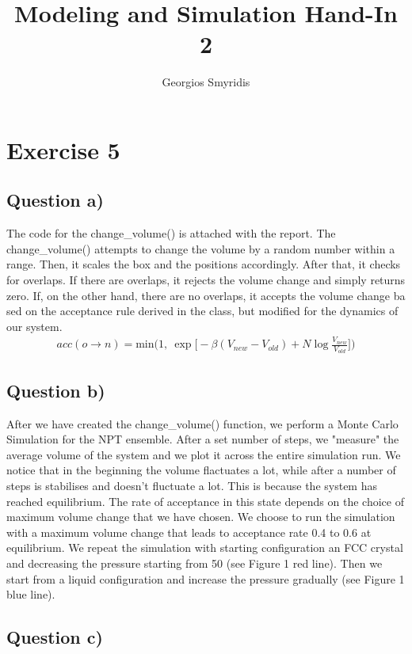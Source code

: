 \documentclass[11pt]{report}
\title{Modeling and Simulation Hand-In 2}
\author{Georgios Smyridis}
\date{}
\begin{document}
\maketitle

\section*{Exercise 5}

\subsection*{Question a)}
The code for the change\_volume() is attached with the report. The change\_volume() attempts to change the volume by a random number within a range. Then, it scales the box and the positions accordingly. After that, it checks for overlaps. If there are overlaps, it rejects the volume change and simply returns zero. If, on the other hand, there are no overlaps, it accepts the volume change ba	sed on the acceptance rule derived in the class, but modified for the dynamics of our system.
\begin{align}
	acc(o\rightarrow n) = \text{min}\bigg(1,\ \exp\bigg[-\beta(V_{new}-V_{old})+N\log\frac{V_{new}}{V_{old}}\bigg]\bigg)
\end{align}

\subsection*{Question b)}

After we have created the change\_volume() function, we perform a Monte Carlo Simulation for the NPT ensemble. After a set number of steps, we "measure" the average volume of the system and we plot it across the entire simulation run. We notice that in the beginning the volume flactuates a lot, while after a number of steps is stabilises and doesn't fluctuate a lot. This is because the system has reached equilibrium. The rate of acceptance in this state depends on the choice of maximum volume change that we have chosen. We choose to run the simulation with a maximum volume change that leads to acceptance rate 0.4 to 0.6 at equilibrium. We repeat the simulation with starting configuration an FCC crystal and decreasing the pressure starting from 50 (see Figure 1 red line). Then we start from a liquid configuration and increase the pressure gradually (see Figure 1 blue line).

\subsection*{Question c)}
\end{document}
